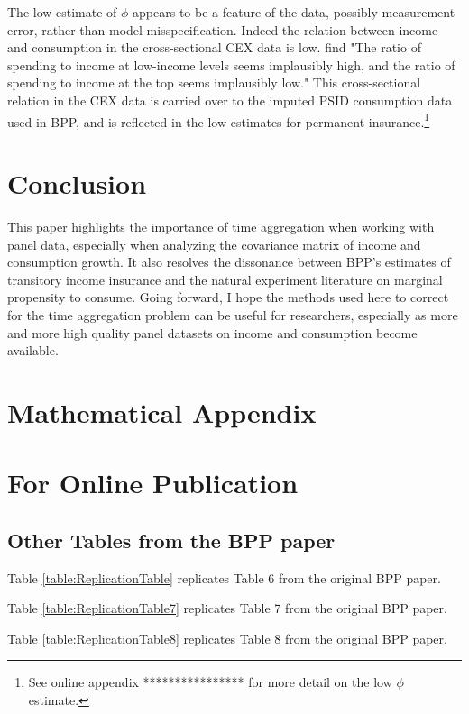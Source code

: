 \documentclass[AER]{AEA}
\begin{document}
The low estimate of $\phi$ appears to be a feature of the data, possibly measurement error, rather than model misspecification. Indeed the relation between income and consumption in the cross-sectional CEX data is low. \cite{NBERc12673} find "The ratio of spending to income at low-income levels seems implausibly high, and the ratio of spending to income at the top seems implausibly low."  This cross-sectional relation in the CEX data is carried over to the imputed PSID consumption data used in BPP, and is reflected in the low estimates for permanent insurance.\footnote{See online appendix **************** for more detail on the low $\phi$ estimate.}

\section{Conclusion}
This paper highlights the importance of time aggregation when working with panel data, especially when analyzing the covariance matrix of income and consumption growth. It also resolves the dissonance between BPP's estimates of transitory income insurance and the natural experiment literature on marginal propensity to consume. Going forward, I hope the methods used here to correct for the time aggregation problem can be useful for researchers, especially as more and more high quality panel datasets on income and consumption become available.





\appendix

\section{Mathematical Appendix}

\newpage
\section{For Online Publication}





\subsection{Other Tables from the BPP paper} \label{table_appendix}

Table \ref{table:ReplicationTable} replicates Table 6 from the original BPP paper.

 

Table \ref{table:ReplicationTable7} replicates Table 7 from the original BPP paper.

 

Table \ref{table:ReplicationTable8} replicates Table 8 from the original BPP paper.
\end{document}
